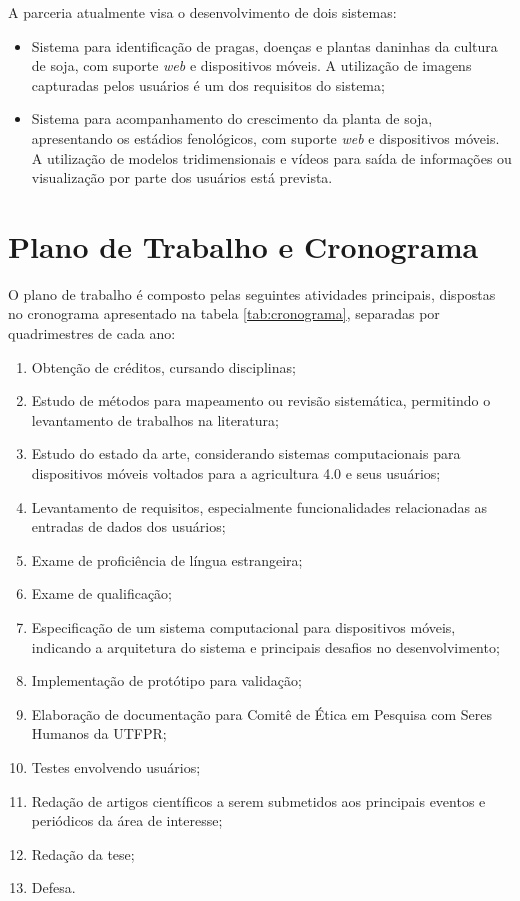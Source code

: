 \documentclass[12pt]{article}
\begin{document}
A parceria atualmente visa o desenvolvimento de dois sistemas:

\begin{itemize}
	\item Sistema para identificação de pragas, doenças e plantas daninhas da cultura de soja, com suporte \textit{web} e dispositivos móveis. A utilização de imagens capturadas pelos usuários é um dos requisitos do sistema;

	\item Sistema para acompanhamento do crescimento da planta de soja, apresentando os estádios fenológicos, com suporte \textit{web} e dispositivos móveis. A utilização de modelos tridimensionais e vídeos para saída de informações ou visualização por parte dos usuários está prevista.
\end{itemize}

\section{Plano de Trabalho e Cronograma}

O plano de trabalho é composto pelas seguintes atividades principais, dispostas no cronograma apresentado na tabela \ref{tab:cronograma}, separadas por quadrimestres de cada ano:

\begin{enumerate}
	\item Obtenção de créditos, cursando disciplinas;
	\item Estudo de métodos para mapeamento ou revisão sistemática, permitindo o levantamento de trabalhos na literatura;
	\item Estudo do estado da arte, considerando sistemas computacionais para dispositivos móveis voltados para a agricultura 4.0 e seus usuários;
	\item Levantamento de requisitos, especialmente funcionalidades relacionadas as entradas de dados dos usuários;
	\item Exame de proficiência de língua estrangeira;
	\item Exame de qualificação;
	\item Especificação de um sistema computacional para dispositivos móveis, indicando a arquitetura do sistema e principais desafios no desenvolvimento;
	\item Implementação de protótipo para validação;
	\item Elaboração de documentação para Comitê de Ética em Pesquisa com Seres Humanos da UTFPR;
	\item Testes envolvendo usuários;
	\item Redação de artigos científicos a serem submetidos aos principais eventos e periódicos da área de interesse;
	\item Redação da tese;
	\item Defesa.
\end{enumerate}
\end{document}
